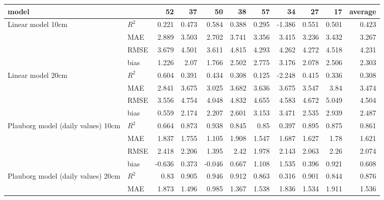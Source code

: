 \begin{tabular}{llrrrrrrrrr}
\hline
 model                               &       &     52 &     37 &     50 &    38 &    57 &     34 &     27 &    17 &   average \\
\hline
 Linear model 10cm                   & $R^2$ &  0.221 &  0.473 &  0.584 & 0.388 & 0.295 & -1.386 &  0.551 & 0.501 &     0.423 \\
                                     & MAE   &  2.889 &  3.503 &  2.702 & 3.741 & 3.356 &  3.415 &  3.236 & 3.432 &     3.267 \\
                                     & RMSE  &  3.679 &  4.501 &  3.611 & 4.815 & 4.293 &  4.262 &  4.272 & 4.518 &     4.231 \\
                                     & bias  &  1.226 &  2.07  &  1.766 & 2.502 & 2.775 &  3.176 &  2.078 & 2.506 &     2.303 \\
 Linear model 20cm                   & $R^2$ &  0.604 &  0.391 &  0.434 & 0.308 & 0.125 & -2.248 &  0.415 & 0.336 &     0.308 \\
                                     & MAE   &  2.841 &  3.675 &  3.025 & 3.682 & 3.636 &  3.675 &  3.547 & 3.84  &     3.474 \\
                                     & RMSE  &  3.556 &  4.754 &  4.048 & 4.832 & 4.655 &  4.583 &  4.672 & 5.049 &     4.504 \\
                                     & bias  &  0.559 &  2.174 &  2.207 & 2.601 & 3.153 &  3.471 &  2.535 & 2.939 &     2.487 \\
 Plauborg model (daily values) 10cm  & $R^2$ &  0.664 &  0.873 &  0.938 & 0.845 & 0.85  &  0.397 &  0.895 & 0.875 &     0.861 \\
                                     & MAE   &  1.837 &  1.755 &  1.105 & 1.908 & 1.547 &  1.687 &  1.627 & 1.78  &     1.621 \\
                                     & RMSE  &  2.418 &  2.206 &  1.395 & 2.42  & 1.978 &  2.143 &  2.063 & 2.26  &     2.074 \\
                                     & bias  & -0.636 &  0.373 & -0.046 & 0.667 & 1.108 &  1.535 &  0.396 & 0.921 &     0.608 \\
 Plauborg model (daily values) 20cm  & $R^2$ &  0.83  &  0.905 &  0.946 & 0.912 & 0.863 &  0.316 &  0.901 & 0.844 &     0.876 \\
                                     & MAE   &  1.873 &  1.496 &  0.985 & 1.367 & 1.538 &  1.836 &  1.534 & 1.911 &     1.536 \\

\end{tabular}
